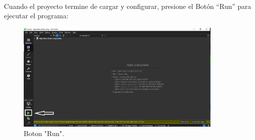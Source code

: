 \documentclass{article}
\begin{document}
\\
Cuando el proyecto termine de cargar y configurar, presione el Botón “Run” para ejecutar el programa:
\begin{figure}[h]
  \includegraphics[width=10cm]{run.PNG}
  \centering
  \caption{Boton "Run".}
  \label{fig:run}
\end{figure}
\end{document}

